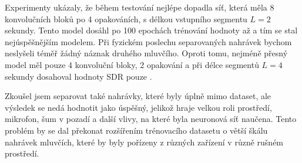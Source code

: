 Experimenty ukázaly, že během testování nejlépe dopadla síť, která měla 8 konvolučních bloků po 4 opakováních, s délkou vstupního segmentu $L=2$ sekundy. Tento model dosáhl po 100 epochách trénování hodnoty až  a tím se stal nejúspěšnějším modelem. Při fyzickém poslechu separovaných nahrávek bychom neslyšeli téměř žádný náznak druhého mluvčího. Oproti tomu, nejméně přesný model měl pouze 4 konvoluční bloky, 2 opakování a při délce segmentů $L=4$ sekundy dosahoval hodnoty SDR pouze .

Zkoušel jsem separovat také nahrávky, které byly úplně mimo dataset, ale výsledek se nedá hodnotit jako úspěšný, jelikož hraje velkou roli prostředí, mikrofon, šum v pozadí a další vlivy, na které byla neuronová síť naučena. Tento problém by se dal překonat rozšířením trénovacího datasetu o větší škálu nahrávek mluvčích, které by byly pořízeny z různých zařízení v různě rušném prostředí.




